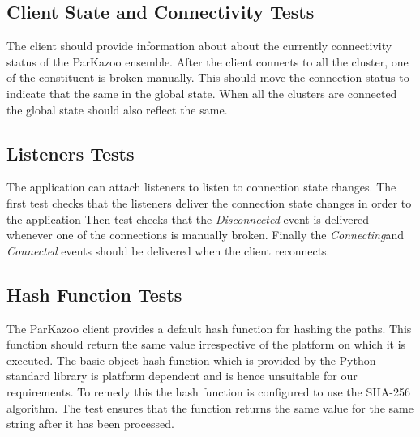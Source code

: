 \subsection{Client State and Connectivity Tests}
The client should provide information about about the currently connectivity status of the ParKazoo ensemble. After the client connects to all the cluster, one of the constituent is broken manually. This should move the connection status to indicate that the same in the global state. When all the clusters are connected the global state should also reflect the same.

\subsection{Listeners Tests}
The application can attach listeners to listen to connection state changes. The first test checks that the listeners deliver the connection state changes in order to the application Then test checks that the \textit{Disconnected} event is delivered whenever one of the connections is manually broken. Finally the \textit{Connecting}and \textit{Connected} events should be delivered when the client reconnects.

\subsection{Hash Function Tests}
The ParKazoo client provides a default hash function for hashing the paths. This function should return the same value irrespective of the platform on which it is executed. The basic object hash function which is provided by the Python standard library is platform dependent and is hence unsuitable for our requirements. To remedy this the hash function is configured to use the SHA-256 algorithm. The test ensures that the function returns the same value for the same string after it has been processed.
